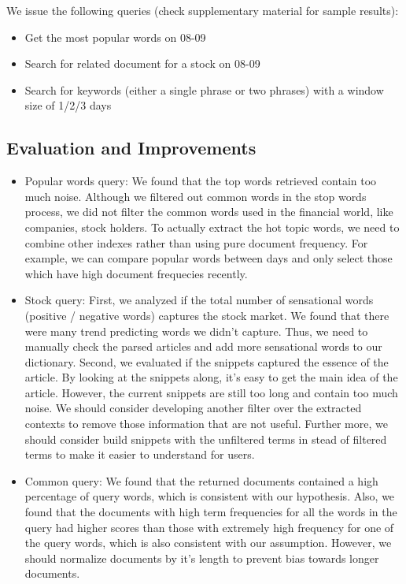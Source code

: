 \documentclass{article}
\begin{document}
We issue the following queries (check supplementary material for sample results): 
    \begin{itemize}
      \item Get the most popular words on 08-09
      \item Search for related document for a stock on 08-09
      \item Search for keywords (either a single phrase or two phrases) with a window size of 1/2/3 days  
    \end{itemize}

\subsection{Evaluation and Improvements}
\begin{itemize}
  \item Popular words query: We found that the top words retrieved contain too much noise. Although we filtered out common words in the stop words process, we did not filter the common words used in the financial world, like companies, stock holders. To actually extract the hot topic words, we need to combine other indexes rather than using pure document frequency. For example, we can compare popular words between days and only select those which have high document frequecies recently.
  \item Stock query: First, we analyzed if the total number of sensational words (positive / negative words) captures the stock market. We found that there were many trend predicting words we didn't capture. Thus, we need to manually check the parsed articles and add more sensational words to our dictionary. Second, we evaluated if the snippets captured the essence of the article. By looking at the snippets along, it's easy to get the main idea of the article. However, the current snippets are still too long and contain too much noise. We should consider developing another filter over the extracted contexts to remove those information that are not useful. Further more, we should consider build snippets with the unfiltered terms in stead of filtered terms to make it easier to understand for users. 
  \item Common query: We found that the returned documents contained a high percentage of query words, which is consistent with our hypothesis. Also, we found that the documents with high term frequencies for all the words in the query had higher scores than those with extremely high frequency for one of the query words, which is also consistent with our assumption. However, we should normalize documents by it's length to prevent bias towards longer documents.
\end{itemize}
\end{document}
